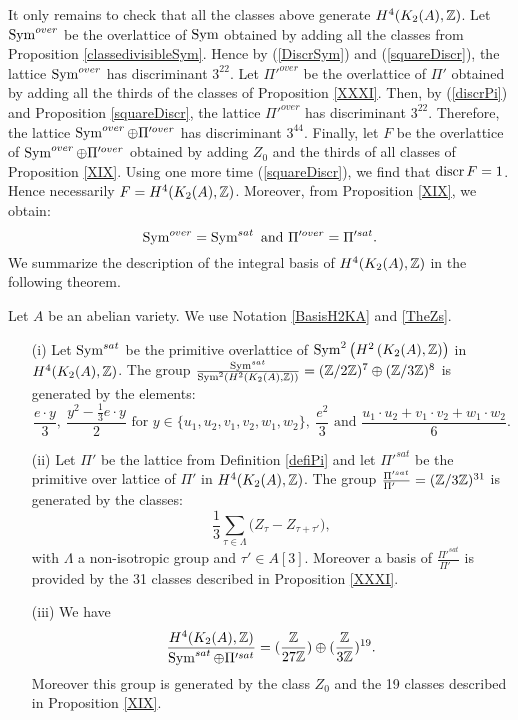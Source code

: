 It only remains to check that all the classes above generate $H^4(K_2(A),\mathbb{Z})$.
Let $\operatorname{Sym}^{over}$ be the overlattice of $\operatorname{Sym}$ obtained by adding all the classes from Proposition \ref{classedivisibleSym}. Hence by (\ref{DiscrSym}) and (\ref{squareDiscr}), the lattice $\operatorname{Sym}^{over}$ has discriminant $3^{22}$. Let $\Pi'^{over}$ be the overlattice of $\Pi'$ obtained by adding all the thirds of the classes of Proposition \ref{XXXI}. Then, by (\ref{discrPi}) and Proposition \ref{squareDiscr}, the lattice $\Pi'^{over}$ has discriminant $3^{22}$. Therefore, the lattice $\operatorname{Sym}^{over}\oplus \Pi'^{over}$ has discriminant $3^{44}$. Finally, let $F$ be the overlattice of $\operatorname{Sym}^{over}\oplus \Pi'^{over}$ obtained by adding $Z_0$ and the thirds of all classes of Proposition \ref{XIX}. Using one more time (\ref{squareDiscr}), we find that $\operatorname{discr} F=1$. Hence necessarily $F=H^4(K_2(A),\mathbb{Z})$. Moreover, from Proposition \ref{XIX}, we obtain: $$\operatorname{Sym}^{over}=\operatorname{Sym}^{sat} \text{ and } \Pi'^{over}=\Pi'^{sat}.$$ We summarize the description of the integral basis of $H^{4}(K_2(A),\mathbb{Z})$ in the following theorem.
\begin{thm}\label{integralbasistheorem}
Let $A$ be an abelian variety. We use Notation \ref{BasisH2KA} and \ref{TheZs}. 
\begin{itemize}
\item[(i)]
Let $\operatorname{Sym}^{sat}$ be the primitive overlattice of $\operatorname{Sym}^2\left(H^2\left(K_{ 2 }( A ),\mathbb{Z}\right)\right)$ in $H^4(K_2(A),\mathbb{Z})$.
The group $\frac{\operatorname{Sym}^{sat}}{\operatorname{Sym}^2\left(H^2\left(K_{ 2 }( A ),\mathbb{Z}\right)\right)}=(\mathbb{Z}/2\mathbb{Z})^{7}\oplus(\mathbb{Z}/3\mathbb{Z})^{8}$ is generated by the elements:
$$\frac{e \cdot y}{3},\ \frac{y^2 - \frac{1}{3} e\cdot y}{2} \text{ for } y\in\{u_1,u_2,v_1,v_2,w_1,w_2\},\ 
\frac{e^2}{3} \text{ and } \frac{u_{1}\cdot u_{2}+v_{1}\cdot v_{2}+w_{1}\cdot w_{2}}{6}.$$
\item[(ii)]
Let $\Pi'$ be the lattice from Definition \ref{defiPi} and let $\Pi'^{sat}$ be the primitive over lattice of $\Pi'$ in $H^4(K_2(A),\mathbb{Z})$.
The group $\frac{\Pi'^{sat}}{\Pi'\ \ \ }=(\mathbb{Z}/3\mathbb{Z})^{31}$ is generated by the classes:
$$\frac{1}{3}\sum_{\tau\in\Lambda} \Big(Z_{\tau} - Z_{\tau+\tau'}\Big),
$$
with $\Lambda$ a non-isotropic group and $\tau'\in A[3]$. Moreover a basis of $\frac{\Pi'^{sat}}{\Pi'\ \ \ }$ is provided by the 31 classes described in Proposition \ref{XXXI}. 
\item[(iii)]
We have $$\frac{H^4(K_2(A),\mathbb{Z})}{\operatorname{Sym}^{sat}\oplus\Pi'^{sat}}=(\frac{\mathbb{Z}}{27\mathbb{Z}})\oplus(\frac{\mathbb{Z}}{3\mathbb{Z}})^{19}.$$
Moreover this group is generated by the class $Z_0$ and the 19 classes described in Proposition \ref{XIX}.
\end{itemize}
\end{thm}
